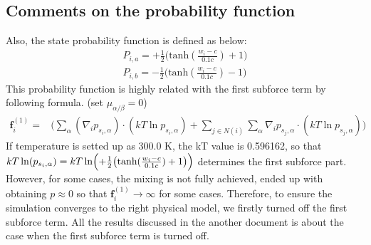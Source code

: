 \documentclass[11pt, oneside]{article}   	%
\begin{document}
\subsection{Comments on the probability function}
Also, the state probability function is defined as below:
\begin{align*}
P_{i,a} = {+ \frac{1}{2}\bigl(  \textrm{tanh}(\frac{w_i - c}{0.1c}) + 1 \bigr) }\\
P_{i,b} = {- \frac{1}{2} \bigl( \textrm{tanh}(\frac{w_i - c}{0.1c}) -1 \bigr)}
\end{align*}
This probability function is highly related with the first subforce term by following formula. (set $\mu_{\alpha/ \beta} = 0$)
\begin{align*}
  \mathbf{f}_i^{(1)} =& \Biggl( \sum_\alpha(\nabla_i p_{s_i,\alpha})\cdot(kT \ln p_{s_i,\alpha}) +\sum_{j \in N(i)}\sum_\alpha \nabla_i p_{s_j,\alpha} \cdot (kT \ln p_{s_j,\alpha})\Biggr) 
  \end{align*}
If temperature is setted up as 300.0 K, the kT value is 0.596162, so that $kT \ln(p_{s_i,\alpha}) = kT \ln \Bigl(+\frac{1}{2}\bigl(\textrm{tanh}(\frac{w_i-c}{0.1c})+1\bigr)\Bigr)$ determines the first subforce part. \\ \noindent
However, for some cases, the mixing is not fully achieved, ended up with obtaining $p \approx 0$ so that $\mathbf{f}_i^{(1)} \rightarrow \infty$ for some cases. Therefore, to ensure the simulation converges to the right physical model, we firstly turned off the first subforce term. All the results discussed in the another document is about the case when the first subforce term is turned off.
\end{document}
